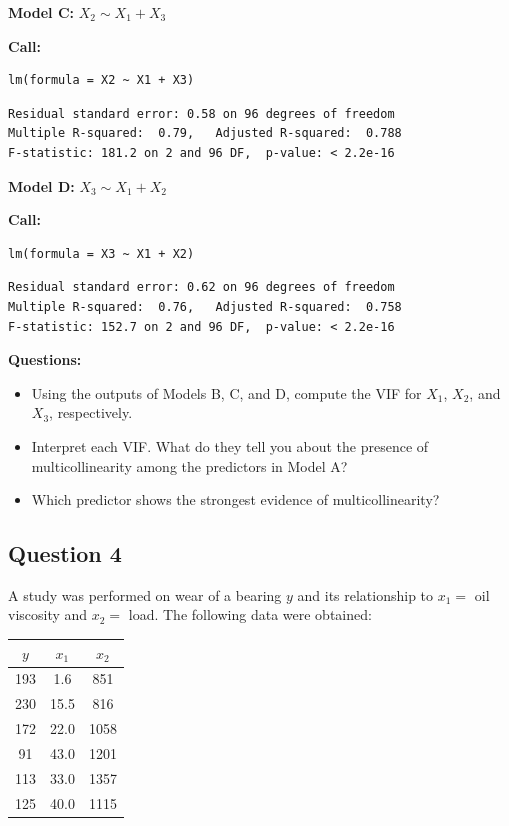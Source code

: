 \textbf{Model C:} $X_2 \sim X_1 + X_3$

\textbf{Call:}
\begin{verbatim}
lm(formula = X2 ~ X1 + X3)
\end{verbatim}

\begin{verbatim}
Residual standard error: 0.58 on 96 degrees of freedom
Multiple R-squared:  0.79,   Adjusted R-squared:  0.788
F-statistic: 181.2 on 2 and 96 DF,  p-value: < 2.2e-16
\end{verbatim}

\textbf{Model D:} $X_3 \sim X_1 + X_2$

\textbf{Call:}
\begin{verbatim}
lm(formula = X3 ~ X1 + X2)
\end{verbatim}

\begin{verbatim}
Residual standard error: 0.62 on 96 degrees of freedom
Multiple R-squared:  0.76,   Adjusted R-squared:  0.758
F-statistic: 152.7 on 2 and 96 DF,  p-value: < 2.2e-16
\end{verbatim}

\textbf{Questions:}

\begin{itemize}
\item[(a)] Using the outputs of Models B, C, and D, compute the VIF for $X_1$, $X_2$, and $X_3$, respectively.

\item[(b)] Interpret each VIF. What do they tell you about the presence of multicollinearity among the predictors in Model A?

\item[(c)] Which predictor shows the strongest evidence of multicollinearity?
\end{itemize}

\clearpage

\subsection{Question 4}

A study was performed on wear of a bearing $y$ and its relationship to $x_1 =$ oil viscosity and $x_2 =$ load. The following data were obtained:

\begin{center}
\begin{tabular}{ccc}
$y$ & $x_1$ & $x_2$ \\
\hline
193 & 1.6 & 851 \\
230 & 15.5 & 816 \\
172 & 22.0 & 1058 \\
91  & 43.0 & 1201 \\
113 & 33.0 & 1357 \\
125 & 40.0 & 1115 \\
\end{tabular}
\end{center}

